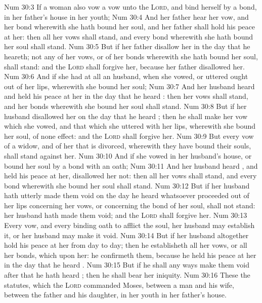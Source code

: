 \vs Num 30:3 If a woman also vow a vow unto the \textsc{Lord}, and bind herself by a bond,  in her father's house in her youth;
\vs Num 30:4 And her father hear her vow, and her bond wherewith she hath bound her soul, and her father shall hold his peace at her: then all her vows shall stand, and every bond wherewith she hath bound her soul shall stand.
\vs Num 30:5 But if her father disallow her in the day that he heareth; not any of her vows, or of her bonds wherewith she hath bound her soul, shall stand: and the \textsc{Lord} shall forgive her, because her father disallowed her.
\vs Num 30:6 And if she had at all an husband, when she vowed, or uttered ought out of her lips, wherewith she bound her soul;
\vs Num 30:7 And her husband heard  and held his peace at her in the day that he heard : then her vows shall stand, and her bonds wherewith she bound her soul shall stand.
\vs Num 30:8 But if her husband disallowed her on the day that he heard ; then he shall make her vow which she vowed, and that which she uttered with her lips, wherewith she bound her soul, of none effect: and the \textsc{Lord} shall forgive her.
\vs Num 30:9 But every vow of a widow, and of her that is divorced, wherewith they have bound their souls, shall stand against her.
\vs Num 30:10 And if she vowed in her husband's house, or bound her soul by a bond with an oath;
\vs Num 30:11 And her husband heard , and held his peace at her,  disallowed her not: then all her vows shall stand, and every bond wherewith she bound her soul shall stand.
\vs Num 30:12 But if her husband hath utterly made them void on the day he heard  whatsoever proceeded out of her lips concerning her vows, or concerning the bond of her soul, shall not stand: her husband hath made them void; and the \textsc{Lord} shall forgive her.
\vs Num 30:13 Every vow, and every binding oath to afflict the soul, her husband may establish it, or her husband may make it void.
\vs Num 30:14 But if her husband altogether hold his peace at her from day to day; then he establisheth all her vows, or all her bonds, which  upon her: he confirmeth them, because he held his peace at her in the day that he heard .
\vs Num 30:15 But if he shall any ways make them void after that he hath heard ; then he shall bear her iniquity.
\vs Num 30:16 These  the statutes, which the \textsc{Lord} commanded Moses, between a man and his wife, between the father and his daughter,  in her youth in her father's house.
